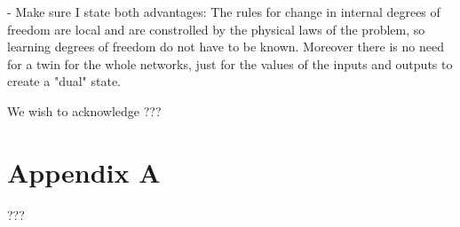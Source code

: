 \documentclass[%
 reprint,
 amsmath,amssymb,
 aps,
]{revtex4-2}
\begin{document}
    - Make sure I state both advantages: The rules for change in internal degrees of freedom are local and are constrolled by the physical laws of the problem, so learning degrees of freedom do not have to be known. Moreover there is no need for a twin for the whole networks, just for the values of the inputs and outputs to create a "dual" state.


\begin{acknowledgments}
We wish to acknowledge ???
\end{acknowledgments}

\appendix

\section{Appendix A}

???

\nocite{*}

\end{document}
